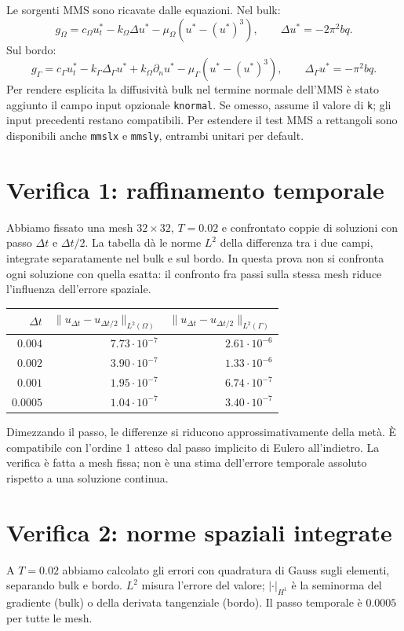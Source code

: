 \documentclass[11pt,a4paper]{article}
\begin{document}
Le sorgenti MMS sono ricavate dalle equazioni. Nel bulk:
\[
 g_\Omega=c_\Omega u_t^*-k_\Omega\Delta u^*
       -\mu_\Omega(u^*-(u^*)^3),\qquad
 \Delta u^*=-2\pi^2bq.
\]
Sul bordo:
\[
 g_\Gamma=c_\Gamma u_t^*-k_\Gamma\Delta_\Gamma u^*
       +k_\Omega\partial_nu^*-\mu_\Gamma(u^*-(u^*)^3),\qquad
 \Delta_\Gamma u^*=-\pi^2bq.
\]
Per rendere esplicita la diffusività bulk nel termine normale dell'MMS è stato aggiunto il campo input opzionale \texttt{knormal}. Se omesso, assume il valore di \texttt{k}; gli input precedenti restano compatibili. Per estendere il test MMS a rettangoli sono disponibili anche \texttt{mmslx} e \texttt{mmsly}, entrambi unitari per default.

\section{Verifica 1: raffinamento temporale}
Abbiamo fissato una mesh $32\times32$, $T=0.02$ e confrontato coppie di soluzioni con passo $\Delta t$ e $\Delta t/2$. La tabella dà le norme $L^2$ della differenza tra i due campi, integrate separatamente nel bulk e sul bordo. In questa prova non si confronta ogni soluzione con quella esatta: il confronto fra passi sulla stessa mesh riduce l'influenza dell'errore spaziale.

\begin{center}
\begin{tabular}{rrr}
\toprule
$\Delta t$ & $\|u_{\Delta t}-u_{\Delta t/2}\|_{L^2(\Omega)}$ & $\|u_{\Delta t}-u_{\Delta t/2}\|_{L^2(\Gamma)}$\\
\midrule
$0.004$  & $7.73\cdot10^{-7}$ & $2.61\cdot10^{-6}$\\
$0.002$  & $3.90\cdot10^{-7}$ & $1.33\cdot10^{-6}$\\
$0.001$  & $1.95\cdot10^{-7}$ & $6.74\cdot10^{-7}$\\
$0.0005$ & $1.04\cdot10^{-7}$ & $3.40\cdot10^{-7}$\\
\bottomrule
\end{tabular}
\end{center}

Dimezzando il passo, le differenze si riducono approssimativamente della metà. È compatibile con l'ordine 1 atteso dal passo implicito di Eulero all'indietro. La verifica è fatta a mesh fissa; non è una stima dell'errore temporale assoluto rispetto a una soluzione continua.

\section{Verifica 2: norme spaziali integrate}
A $T=0.02$ abbiamo calcolato gli errori con quadratura di Gauss sugli elementi, separando bulk e bordo. $L^2$ misura l'errore del valore; $|\cdot|_{H^1}$ è la seminorma del gradiente (bulk) o della derivata tangenziale (bordo). Il passo temporale è $0.0005$ per tutte le mesh.
\end{document}
